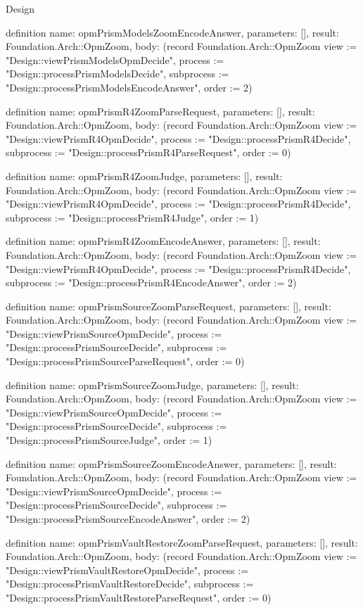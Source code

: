 \begin{lexlean}{Design}
\begin{semanticmodule}
definition{
  name: opmPrismModelsZoomEncodeAnswer,
  parameters: [],
  result: Foundation.Arch::OpmZoom,
  body: (record Foundation.Arch::OpmZoom {view := "Design::viewPrismModelsOpmDecide", process := "Design::processPrismModelsDecide", subprocess := "Design::processPrismModelsEncodeAnswer", order := 2})
}

definition{
  name: opmPrismR4ZoomParseRequest,
  parameters: [],
  result: Foundation.Arch::OpmZoom,
  body: (record Foundation.Arch::OpmZoom {view := "Design::viewPrismR4OpmDecide", process := "Design::processPrismR4Decide", subprocess := "Design::processPrismR4ParseRequest", order := 0})
}

definition{
  name: opmPrismR4ZoomJudge,
  parameters: [],
  result: Foundation.Arch::OpmZoom,
  body: (record Foundation.Arch::OpmZoom {view := "Design::viewPrismR4OpmDecide", process := "Design::processPrismR4Decide", subprocess := "Design::processPrismR4Judge", order := 1})
}

definition{
  name: opmPrismR4ZoomEncodeAnswer,
  parameters: [],
  result: Foundation.Arch::OpmZoom,
  body: (record Foundation.Arch::OpmZoom {view := "Design::viewPrismR4OpmDecide", process := "Design::processPrismR4Decide", subprocess := "Design::processPrismR4EncodeAnswer", order := 2})
}

definition{
  name: opmPrismSourceZoomParseRequest,
  parameters: [],
  result: Foundation.Arch::OpmZoom,
  body: (record Foundation.Arch::OpmZoom {view := "Design::viewPrismSourceOpmDecide", process := "Design::processPrismSourceDecide", subprocess := "Design::processPrismSourceParseRequest", order := 0})
}

definition{
  name: opmPrismSourceZoomJudge,
  parameters: [],
  result: Foundation.Arch::OpmZoom,
  body: (record Foundation.Arch::OpmZoom {view := "Design::viewPrismSourceOpmDecide", process := "Design::processPrismSourceDecide", subprocess := "Design::processPrismSourceJudge", order := 1})
}

definition{
  name: opmPrismSourceZoomEncodeAnswer,
  parameters: [],
  result: Foundation.Arch::OpmZoom,
  body: (record Foundation.Arch::OpmZoom {view := "Design::viewPrismSourceOpmDecide", process := "Design::processPrismSourceDecide", subprocess := "Design::processPrismSourceEncodeAnswer", order := 2})
}

definition{
  name: opmPrismVaultRestoreZoomParseRequest,
  parameters: [],
  result: Foundation.Arch::OpmZoom,
  body: (record Foundation.Arch::OpmZoom {view := "Design::viewPrismVaultRestoreOpmDecide", process := "Design::processPrismVaultRestoreDecide", subprocess := "Design::processPrismVaultRestoreParseRequest", order := 0})
}


\end{semanticmodule}
\end{lexlean}
